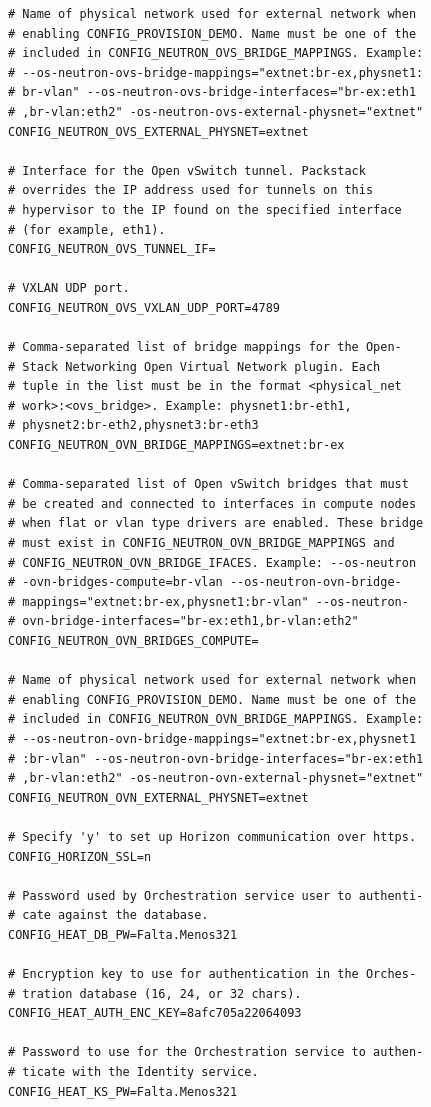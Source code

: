 \documentclass[12pt,a4paper,oneside]{book}
\begin{document}
\begin{lstlisting}[style=codigobase,  caption= answers.cfg]
# Name of physical network used for external network when
# enabling CONFIG_PROVISION_DEMO. Name must be one of the
# included in CONFIG_NEUTRON_OVS_BRIDGE_MAPPINGS. Example:
# --os-neutron-ovs-bridge-mappings="extnet:br-ex,physnet1:
# br-vlan" --os-neutron-ovs-bridge-interfaces="br-ex:eth1
# ,br-vlan:eth2" -os-neutron-ovs-external-physnet="extnet"
CONFIG_NEUTRON_OVS_EXTERNAL_PHYSNET=extnet

# Interface for the Open vSwitch tunnel. Packstack 
# overrides the IP address used for tunnels on this 
# hypervisor to the IP found on the specified interface 
# (for example, eth1).
CONFIG_NEUTRON_OVS_TUNNEL_IF=

# VXLAN UDP port.
CONFIG_NEUTRON_OVS_VXLAN_UDP_PORT=4789

# Comma-separated list of bridge mappings for the Open-
# Stack Networking Open Virtual Network plugin. Each 
# tuple in the list must be in the format <physical_net
# work>:<ovs_bridge>. Example: physnet1:br-eth1,
# physnet2:br-eth2,physnet3:br-eth3
CONFIG_NEUTRON_OVN_BRIDGE_MAPPINGS=extnet:br-ex

# Comma-separated list of Open vSwitch bridges that must 
# be created and connected to interfaces in compute nodes
# when flat or vlan type drivers are enabled. These bridge 
# must exist in CONFIG_NEUTRON_OVN_BRIDGE_MAPPINGS and
# CONFIG_NEUTRON_OVN_BRIDGE_IFACES. Example: --os-neutron
# -ovn-bridges-compute=br-vlan --os-neutron-ovn-bridge-
# mappings="extnet:br-ex,physnet1:br-vlan" --os-neutron-
# ovn-bridge-interfaces="br-ex:eth1,br-vlan:eth2"
CONFIG_NEUTRON_OVN_BRIDGES_COMPUTE=

# Name of physical network used for external network when
# enabling CONFIG_PROVISION_DEMO. Name must be one of the
# included in CONFIG_NEUTRON_OVN_BRIDGE_MAPPINGS. Example:
# --os-neutron-ovn-bridge-mappings="extnet:br-ex,physnet1
# :br-vlan" --os-neutron-ovn-bridge-interfaces="br-ex:eth1
# ,br-vlan:eth2" -os-neutron-ovn-external-physnet="extnet"
CONFIG_NEUTRON_OVN_EXTERNAL_PHYSNET=extnet

# Specify 'y' to set up Horizon communication over https.
CONFIG_HORIZON_SSL=n

# Password used by Orchestration service user to authenti-
# cate against the database.
CONFIG_HEAT_DB_PW=Falta.Menos321

# Encryption key to use for authentication in the Orches-
# tration database (16, 24, or 32 chars).
CONFIG_HEAT_AUTH_ENC_KEY=8afc705a22064093

# Password to use for the Orchestration service to authen-
# ticate with the Identity service.
CONFIG_HEAT_KS_PW=Falta.Menos321


\end{lstlisting}
\end{document}

